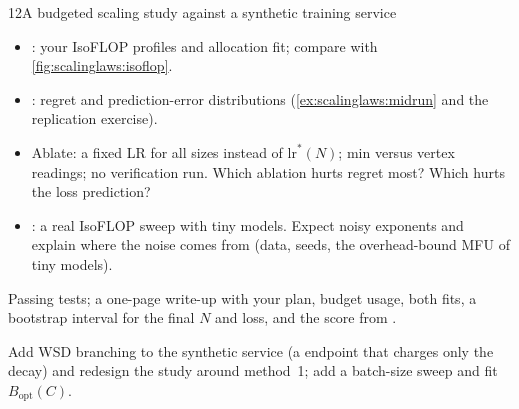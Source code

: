 \begin{labbox}{12}{A budgeted scaling study against a synthetic training service}
\begin{itemize}
\item {}: your IsoFLOP profiles and allocation fit; compare
      with \cref{fig:scalinglaws:isoflop}.
\item {}: regret and prediction-error distributions
      (\cref{ex:scalinglaws:midrun} and the replication exercise).
\item Ablate: a fixed LR for all sizes instead of $\text{lr}^*(N)$; min versus vertex readings;
      no verification run. Which ablation hurts regret most? Which hurts the loss prediction?
\item {}: a real IsoFLOP sweep with tiny models. Expect noisy exponents and
      explain where the noise comes from (data, seeds, the overhead-bound MFU of tiny models).
\end{itemize}

Passing tests; a one-page write-up with your plan, budget usage, both fits, a bootstrap
interval for the final $N$ and loss, and the score from .

Add WSD branching to the synthetic service (a  endpoint that
charges only the decay) and redesign the study around method~1; add a batch-size sweep and fit
$B_{\text{opt}}(C)$.
\end{labbox}
